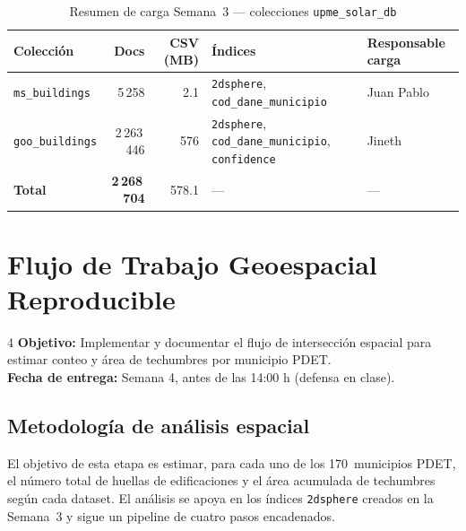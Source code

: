 \documentclass[12pt, a4paper]{report}
\begin{document}
\begin{table}[H]
  \centering
  \caption{Resumen de carga Semana~3 — colecciones \texttt{upme\_solar\_db}}
  \label{tab:resumen_s3}
  \begin{tabularx}{\textwidth}{lrrlX}
    \toprule
    \textbf{Colección}
      & \textbf{Docs}
      & \textbf{CSV (MB)}
      & \textbf{Índices}
      & \textbf{Responsable carga} \\
    \midrule
    \texttt{ms\_buildings}
      & 5\,258
      & 2.1
      & \texttt{2dsphere}, \texttt{cod\_dane\_municipio}
      & Juan Pablo \\
    \texttt{goo\_buildings}
      & 2\,263\,446
      & 576
      & \texttt{2dsphere}, \texttt{cod\_dane\_municipio}, \texttt{confidence}
      & Jineth \\
    \midrule
    \textbf{Total}
      & \textbf{2\,268\,704}
      & 578.1
      & —
      & — \\
    \bottomrule
  \end{tabularx}
\end{table}

\chapter{Flujo de Trabajo Geoespacial Reproducible}
\label{cap:entrega4}

\begin{semanabox}[Entrega 4]{4}
  \textbf{Objetivo:} Implementar y documentar el flujo de intersección espacial
  para estimar conteo y área de techumbres por municipio PDET.\\
  \textbf{Fecha de entrega:} Semana 4, antes de las 14:00 h (defensa en clase).
\end{semanabox}

\section{Metodología de análisis espacial}

El objetivo de esta etapa es estimar, para cada uno de los 170~municipios
PDET, el número total de huellas de edificaciones y el área acumulada de
techumbres según cada dataset. El análisis se apoya en los índices
\texttt{2dsphere} creados en la Semana~3 y sigue un pipeline de cuatro
pasos encadenados.
\end{document}
